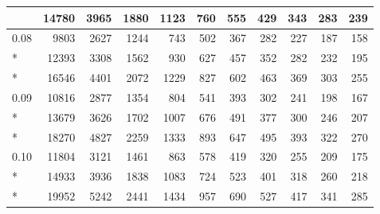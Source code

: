 {\begin{longtable}{lrrrrrrrrrr}
 & 14780 & 3965 & 1880 & 1123 & 760 & 555 & 429 & 343 & 283 & 239\\\midrule
0.08 & 9803 & 2627 & 1244 & 743 & 502 & 367 & 282 & 227 & 187 & 158\\*
 & 12393 & 3308 & 1562 & 930 & 627 & 457 & 352 & 282 & 232 & 195\\*
 & 16546 & 4401 & 2072 & 1229 & 827 & 602 & 463 & 369 & 303 & 255\\\midrule
0.09 & 10816 & 2877 & 1354 & 804 & 541 & 393 & 302 & 241 & 198 & 167\\*
 & 13679 & 3626 & 1702 & 1007 & 676 & 491 & 377 & 300 & 246 & 207\\*
 & 18270 & 4827 & 2259 & 1333 & 893 & 647 & 495 & 393 & 322 & 270\\\midrule
0.10 & 11804 & 3121 & 1461 & 863 & 578 & 419 & 320 & 255 & 209 & 175\\*
 & 14933 & 3936 & 1838 & 1083 & 724 & 523 & 401 & 318 & 260 & 218\\*
 & 19952 & 5242 & 2441 & 1434 & 957 & 690 & 527 & 417 & 341 & 285\\\midrule
\end{longtable}}
